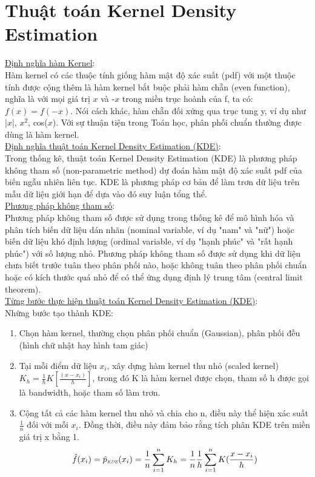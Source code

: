 \documentclass[a4paper, 13pt]{report}
\begin{document}
\section{Thuật toán Kernel Density Estimation}
\underline{Định nghĩa hàm Kernel}:\\
Hàm kernel có các thuộc tính giống hàm mật độ xác suất (pdf) với một thuộc tính được cộng thêm là hàm kernel bắt buộc phải hàm chẵn (even function), nghĩa là với mọi giá trị $x$ và -$x$ trong miền trục hoành của f, ta có: $f(x) = f(-x)$. Nói cách khác, hàm chẵn đối xứng qua trục tung y, ví dụ như |$x$|, $x^2$, cos($x$). Với sự thuận tiện trong Toán học, phân phối chuẩn thường được dùng là hàm kernel.\\
\underline{Định nghĩa thuật toán Kernel Density Estimation (KDE)}:\\
Trong thống kê, thuật toán Kernel Density Estimation (KDE) là phương pháp không tham số (non-parametric method) dự đoán hàm mật độ xác suất pdf của biến ngẫu nhiên liên tục. KDE là phương pháp cơ bản để làm trơn dữ liệu trên mẫu dữ liệu giới hạn để dựa vào đó suy luận tổng thể.\\
\underline{Phương pháp không tham số}:\\
Phương pháp không tham số được sử dụng trong thống kê để mô hình hóa và phân tích biến dữ liệu dán nhãn (nominal variable, ví dụ "nam" và "nữ") hoặc biến dữ liệu khó định lượng (ordinal variable, ví dụ "hạnh phúc" và "rất hạnh phúc") với số lượng nhỏ. Phương pháp không tham số được sử dụng khi dữ liệu chưa biết trước tuân theo phân phối nào, hoặc không tuân theo phân phối chuẩn hoặc có kích thước quá nhỏ để có thể ứng dụng định lý trung tâm (central limit theorem). \\
\underline{Từng bước thực hiện thuật toán Kernel Density Estimation (KDE)}:\\
Những bước tạo thành KDE:\\
\begin{enumerate}
\item Chọn hàm kernel, thường chọn phân phối chuẩn (Gaussian), phân phối đều (hình chữ nhật hay hình tam giác)
\item Tại mỗi điểm dữ liệu $x_i$, xây dựng hàm kernel thu nhỏ (scaled kernel) $K_h = \frac{1}{h}K[\frac{(x-x_i)}{h}]$, trong đó K là hàm kernel được chọn, tham số h được gọi là bandwidth, hoặc tham số làm trơn. 
\item Cộng tất cả các hàm kernel thu nhỏ và chia cho n, điều này thể hiện xác suất $\frac{1}{n}$ đối với mỗi $x_i$. Đồng thời, điều này đảm bảo rằng tích phân KDE trên miền giá trị x bằng 1.\\  
\[
\hat{f}(x_i) = \hat{p}_\textit{\tiny\tiny KDE}(x_i) = \frac{1}{n}\sum_{i=1}^{n} K_h = \frac{1}{n}\frac{1}{h}\sum_{i=1}^{n} K(\frac{x-x_i}{h})
\]
\end{enumerate}
\end{document}
